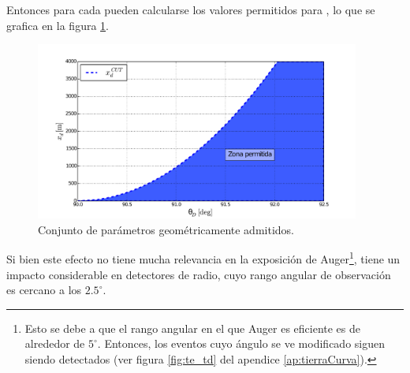 	Entonces para cada \xd{} pueden calcularse los valores permitidos para \td{}, lo que se grafica en la figura \ref{fig:dx_thcut0}.
	\begin{figure}[ht!]
		\centering
		\includegraphics[width=0.95\textwidth]{./fig/appendix/thetaDCut_mod}
		\caption{\label{fig:dx_thcut0}
		Conjunto de par\'ametros geom\'etricamente admitidos.
		}
	\end{figure}
	Si bien este efecto no tiene mucha relevancia en la exposici\'on de Auger\footnote{Esto se debe a que el rango angular en el que Auger es eficiente es de alrededor de $5^\circ$. Entonces, los eventos cuyo \'angulo se ve modificado siguen siendo detectados (ver figura \ref{fig:te_td} del apendice \ref{ap:tierraCurva}).}, tiene un impacto considerable en detectores de radio, cuyo rango angular de observaci\'on es cercano a los $2.5^\circ$.
	
